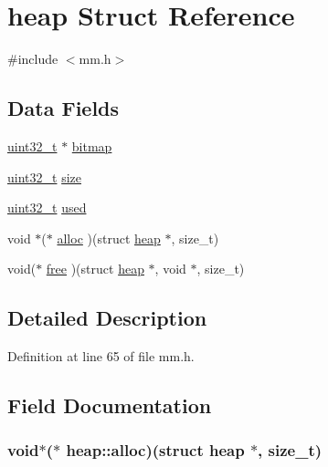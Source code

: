 \hypertarget{structheap}{\section{heap Struct Reference}
\label{structheap}
}


{\ttfamily \#include $<$mm.\+h$>$}

\subsection*{Data Fields}
\begin{DoxyCompactItemize}
\item 
\hyperlink{aplus_8h_a53a0df51603c77c2aa5b9ea61b606a82}{uint32\+\_\+t} $\ast$ \hyperlink{structheap_a5243ef46c552fc0968aa2bcdaf6725d1}{bitmap}
\item 
\hyperlink{aplus_8h_a53a0df51603c77c2aa5b9ea61b606a82}{uint32\+\_\+t} \hyperlink{structheap_a486fb531d24b9ee5f17b7ffe96689705}{size}
\item 
\hyperlink{aplus_8h_a53a0df51603c77c2aa5b9ea61b606a82}{uint32\+\_\+t} \hyperlink{structheap_a37f3f6d6d39562f3cca452eafebcd7ac}{used}
\item 
void $\ast$($\ast$ \hyperlink{structheap_a8b4bc8c3f0ed79efd52d61a27a62a130}{alloc} )(struct \hyperlink{structheap}{heap} $\ast$, size\+\_\+t)
\item 
void($\ast$ \hyperlink{structheap_ae53b14c50bbb9daab4346cd0873bda02}{free} )(struct \hyperlink{structheap}{heap} $\ast$, void $\ast$, size\+\_\+t)
\end{DoxyCompactItemize}


\subsection{Detailed Description}


Definition at line 65 of file mm.\+h.



\subsection{Field Documentation}
\hypertarget{structheap_a8b4bc8c3f0ed79efd52d61a27a62a130}{
\subsubsection[{alloc}]{\setlength{\rightskip}{0pt plus 5cm}void$\ast$($\ast$ heap\+::alloc)(struct {\bf heap} $\ast$, size\+\_\+t)}}\label{structheap_a8b4bc8c3f0ed79efd52d61a27a62a130}


